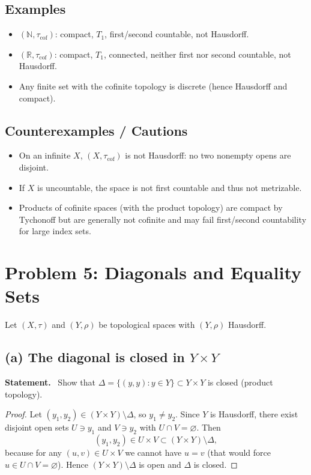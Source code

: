\documentclass[12pt,a4paper]{article}
\newenvironment{statement}{\par\noindent\textbf{Statement.}\ }{\par}
\theoremstyle{plain}
\theoremstyle{definition}
\theoremstyle{remark}
\theoremstyle{remark}
\begin{document}
	\subsection*{Examples}
	\begin{itemize}
		\item $(\mathbb{N},\tau_{\mathrm{cof}})$: compact, $T_1$, first/second countable, not Hausdorff.
		\item $(\mathbb{R},\tau_{\mathrm{cof}})$: compact, $T_1$, connected, neither first nor second countable, not Hausdorff.
		\item Any finite set with the cofinite topology is discrete (hence Hausdorff and compact).
	\end{itemize}
	
	\subsection*{Counterexamples / Cautions}
	\begin{itemize}
		\item On an infinite $X$, $(X,\tau_{\mathrm{cof}})$ is not Hausdorff: no two nonempty opens are disjoint.
		\item If $X$ is uncountable, the space is not first countable and thus not metrizable.
		\item Products of cofinite spaces (with the product topology) are compact by Tychonoff but are generally not cofinite and may fail first/second countability for large index sets.
	\end{itemize}
	
	
	\section*{Problem 5: Diagonals and Equality Sets}
	
	Let $(X,\tau)$ and $(Y,\rho)$ be topological spaces with $(Y,\rho)$ Hausdorff.
	
	\subsection*{(a) The diagonal is closed in $Y\times Y$}
	\begin{statement}
		Show that $\Delta=\{(y,y):y\in Y\}\subset Y\times Y$ is closed (product topology).
	\end{statement}
	
	\begin{proof}
		Let $(y_1,y_2)\in (Y\times Y)\setminus\Delta$, so $y_1\ne y_2$. Since $Y$ is Hausdorff, there exist disjoint open sets $U\ni y_1$ and $V\ni y_2$ with $U\cap V=\varnothing$. Then
		\[
		(y_1,y_2)\in U\times V \subset (Y\times Y)\setminus \Delta,
		\]
		because for any $(u,v)\in U\times V$ we cannot have $u=v$ (that would force $u\in U\cap V=\varnothing$). Hence $(Y\times Y)\setminus \Delta$ is open and $\Delta$ is closed.
	\end{proof}
	
\end{document}
